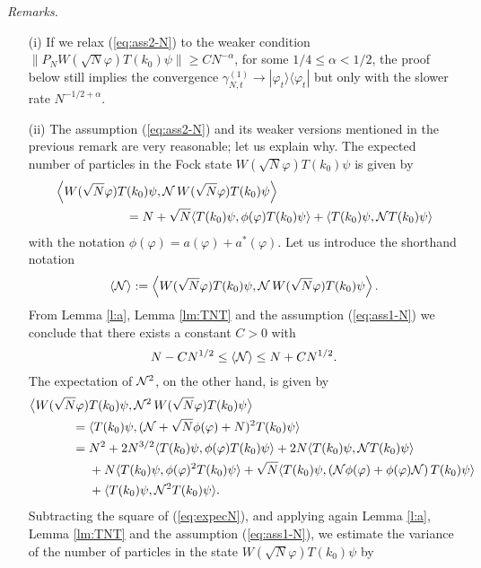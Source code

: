 \documentclass[11pt,a4paper]{article}
\newcommand{\cN}{{\cal N}}
\begin{document}
{\it Remarks. } 
\begin{itemize}
\item[(i)] If we relax (\ref{eq:ass2-N}) to the weaker condition $\| P_N W (\sqrt{N} \varphi) T(k_0) \psi \| \geq C N^{-\alpha}$, for some $1/4 \leq \alpha < 1/2$, the proof below still implies the convergence $\gamma^{(1)}_{N,t} \to |\varphi_t \rangle \langle \varphi_t|$ but only with the slower rate $N^{-1/2+ \alpha}$. 
\item[(ii)] The assumption (\ref{eq:ass2-N}) and its weaker versions mentioned in the previous remark 
are very reasonable; let us explain why. The expected number of particles in the Fock state $W(\sqrt{N} \varphi) T(k_0) \psi$ is given by
\begin{equation}\label{eq:expecN}
\begin{split} &\left\langle W(\sqrt{N} \varphi) T(k_0) \psi , \cN \, W(\sqrt{N} \varphi) T(k_0) \psi \right\rangle \\ & \hspace{2cm}= N + \sqrt{N} \langle T(k_0) \psi , \phi (\varphi) T(k_0) \psi \rangle + \langle T(k_0) \psi , \cN T(k_0) \psi \rangle \end{split} \end{equation}
with the notation $\phi (\varphi) = a(\varphi) + a^* (\varphi)$.
Let us introduce the shorthand notation
\[\langle \cN \rangle := \left\langle W(\sqrt{N} \varphi) T(k_0) \psi , \cN \, W(\sqrt{N} \varphi) T(k_0) \psi \right\rangle.\]
{F}rom Lemma \ref{l:a}, Lemma \ref{lm:TNT} and the assumption (\ref{eq:ass1-N}) we conclude that there exists a constant $C >0$ with 
\[ N - CN^{1/2} \leq \langle \cN \rangle \leq N + C N^{1/2}. \]
The expectation of $\cN^2$, on the other hand, is given by
\[ \begin{split} 
\big\langle W(\sqrt{N} \varphi) &T(k_0)  \psi , \cN^2 \, W(\sqrt{N} \varphi) T(k_0) \psi \big\rangle \\
= \; &\langle T(k_0) \psi , (\cN + \sqrt{N} \phi (\varphi) + N)^2 T(k_0)
\psi \rangle \\ = \; &N^2 + 2 N^{3/2} \langle T(k_0) \psi , \phi (\varphi)
T(k_0) \psi \rangle + 2N \langle T(k_0) \psi , \cN T(k_0) \psi \rangle \\
&+N \langle  T(k_0) \psi , \phi (\varphi)^2 T(k_0) \psi \rangle + \sqrt{N}
\langle   T(k_0) \psi ,  \left( \cN \phi (\varphi) + \phi (\varphi) \cN
\right) T(k_0) \psi \rangle \\ &+ \langle T(k_0) \psi, \cN^2 T(k_0) \psi
\rangle. \end{split} \]
 Subtracting the square of (\ref{eq:expecN}), and applying again Lemma \ref{l:a}, Lemma \ref{lm:TNT} and the assumption (\ref{eq:ass1-N}), we estimate the variance of the number of particles in the state $W(\sqrt{N} \varphi) T(k_0) \psi$ by

\end{itemize}
\end{document}
